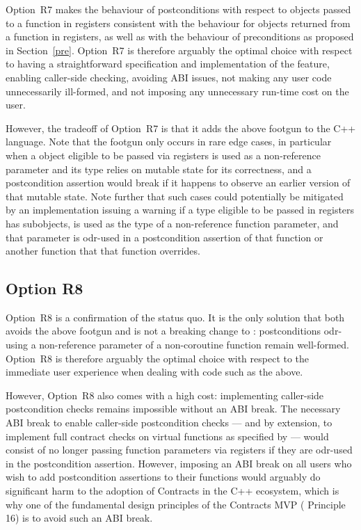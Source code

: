 Option~R7 makes the behaviour of postconditions with respect to objects passed to a function in registers consistent with the behaviour for objects returned from a function in registers, as well as with the behaviour of preconditions as proposed in Section~\ref{pre}. Option~R7 is therefore arguably the optimal choice with respect to having a straightforward specification and implementation of the feature, enabling caller-side checking, avoiding ABI issues, not making any user code unnecessarily ill-formed, and not imposing any unnecessary run-time cost on the user.

However, the tradeoff of Option~R7 is that it adds the above footgun to the C++ language. Note that the footgun only occurs in rare edge cases, in particular when a  object eligible to be passed via registers is used as a non-reference parameter and its type relies on mutable state for its correctness, and a postcondition assertion would break if it happens to observe an earlier version of that mutable state. Note further that such cases could potentially be mitigated by an implementation issuing a warning if a type eligible to be passed in registers has  subobjects, is used as the type of a non-reference function parameter, and that parameter is odr-used in a postcondition assertion of that function or another function that that function overrides.

\subsection*{Option R8}

Option~R8 is a confirmation of the status quo. It is the only solution that both avoids the above footgun and is not a breaking change to \cite{P2900R10}: postconditions odr-using a  non-reference parameter of a non-coroutine function remain well-formed. Option~R8 is therefore arguably the optimal choice with respect to the immediate user experience when dealing with code such as the above.

However, Option~R8 also comes with a high cost: implementing caller-side postcondition checks remains impossible without an ABI break. The necessary ABI break to enable caller-side postcondition checks --- and by extension, to implement full contract checks on virtual functions as specified by \cite{P2900R10} --- would consist of no longer passing function parameters via registers if they are odr-used in the postcondition assertion. However, imposing an ABI break on all users who wish to add postcondition assertions to their functions would arguably do significant harm to the adoption of Contracts in the C++ ecosystem, which is why one of the fundamental design principles of the Contracts MVP (\cite{P2900R10} Principle 16) is to avoid such an ABI break.

